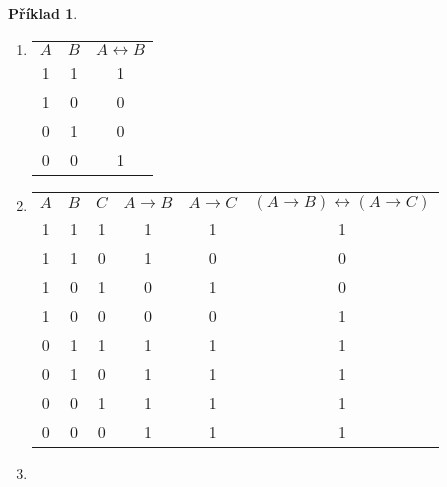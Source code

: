 \documentclass[a4paper]{article}
\theoremstyle{definition}
\newtheorem{priklad}{Příklad}
\begin{document}
\begin{priklad}
\begin{enumerate}
        \item
        
            \begin{tabular}{|c|c|c|}
                \hline 
                $ A $ & $ B $ & $ A\leftrightarrow B $ \\
                1 & 1 & 1 \\
                1 & 0 & 0 \\
                0 & 1 & 0 \\
                0 & 0 & 1 \\
                \hline
            \end{tabular}
    
        \item
        
        \begin{tabular}{|c|c|c|c|c|c|}
            \hline 
            $ A $ & $ B $ & $ C $ & $ A\rightarrow B $ & $ A\rightarrow C $ & $ (A\rightarrow B)\leftrightarrow (A\rightarrow C) $ \\
            1 & 1 & 1 & 1 & 1 & 1 \\
            1 & 1 & 0 & 1 & 0 & 0 \\
            1 & 0 & 1 & 0 & 1 & 0 \\
            1 & 0 & 0 & 0 & 0 & 1 \\
            0 & 1 & 1 & 1 & 1 & 1 \\
            0 & 1 & 0 & 1 & 1 & 1 \\
            0 & 0 & 1 & 1 & 1 & 1 \\
            0 & 0 & 0 & 1 & 1 & 1 \\
            \hline
        \end{tabular}
    
    \item
    

\end{enumerate}
\end{priklad}
\end{document}
